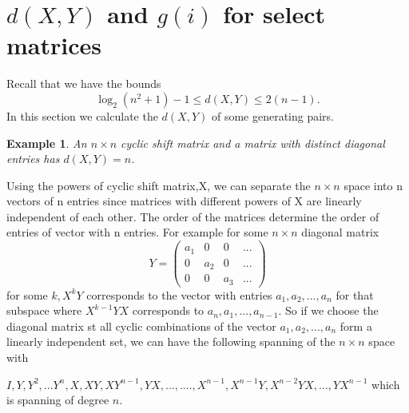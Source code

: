 \documentclass[11pt]{amsart}
\numberwithin{equation}{section}
\numberwithin{figure}{section}
\numberwithin{theorem}{section}
\newtheorem{example}{Example}
\begin{document}
\section{$d(X,Y)$ and $g(i)$ for select matrices}
Recall that we have the bounds $$\log_2(n^2+1)-1\leq d(X,Y)\leq 2(n-1).$$ In this section we calculate the $d(X,Y)$ of some generating pairs. 
\begin{example}
 An $n\times n$ cyclic shift matrix and a matrix with distinct diagonal entries has $d(X,Y)=n$. 
\end{example}
Using the powers of cyclic shift matrix,X, we can separate the $n\times n$ space into n vectors of n entries  since matrices with different powers of X are linearly independent of each other. The order of the  matrices determine the order of entries of vector with n entries. For example for some $n \times n$ diagonal matrix $$Y=\begin{pmatrix}a_1&0&0&...\\0&a_2&0&...\\0&0&a_3&...\end{pmatrix}$$
for some $k, X^k Y$ corresponds to the vector with entries $a_1,a_2,...,a_{n}$ for that subspace where $X^{k-1}YX $ corresponds to $a_{n},a_1,...,a_{n-1}$.
So if we choose the diagonal matrix st all cyclic combinations of the vector $a_1,a_2,...,a_{n}$ form a linearly independent set, we can have the following spanning of the $n \times n$ space with 

$I,Y,Y^2,...Y^n, X, XY, XY^{n-1}, YX,..., ...., X^{n-1}, X^{n-1}Y, X^{n-2}YX,..., YX^{n-1} $
which is spanning of degree $n$.
\end{document}
